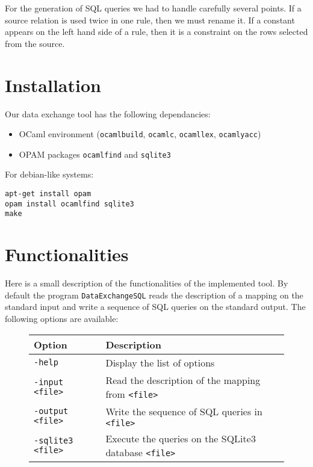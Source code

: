 \documentclass[a4paper, 11pt]{article}
\begin{document}
For the generation of SQL queries we had to handle carefully several points. If a source relation is used twice in one rule, then we must rename it. If a constant appears on the left hand side of a rule, then it is a constraint on the rows selected from the source.

\section{Installation}

Our data exchange tool has the following dependancies:
\begin{itemize}
	\item OCaml environment (\verb|ocamlbuild|, \verb|ocamlc|, \verb|ocamllex|, \verb|ocamlyacc|)
	\item OPAM packages \verb|ocamlfind| and \verb|sqlite3|
\end{itemize}

\noindent For debian-like systems:
\begin{verbatim}
apt-get install opam
opam install ocamlfind sqlite3
make
\end{verbatim}

\section{Functionalities}

Here is a small description of the functionalities of the implemented tool. By default the program \verb|DataExchangeSQL| reads the description of a mapping on the standard input and write a sequence of SQL queries on the standard output. The following options are available:

\begin{figure}[h!]
\centering
\begin{tabular}{ll}
Option & Description\\
\hline
\verb|-help| & Display the list of options \\
\verb|-input <file>| & Read the description of the mapping from \verb|<file>|\\
\verb|-output <file>| & Write the sequence of SQL queries in \verb|<file>|\\
\verb|-sqlite3 <file>| & Execute the queries on the SQLite3 database \verb|<file>|
\end{tabular}
\end{figure}
\end{document}
